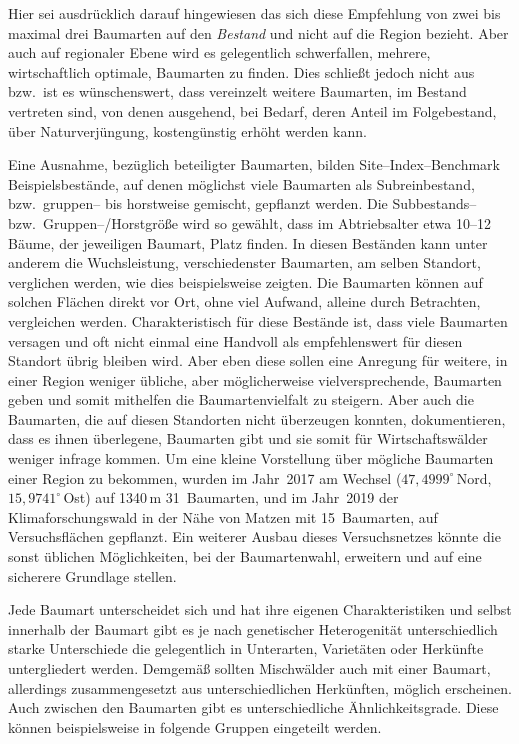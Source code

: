 \documentclass[twocolumn]{scrartcl}
\begin{document}
Hier sei ausdrücklich darauf hingewiesen das sich diese Empfehlung von zwei bis
maximal drei Baumarten auf den \emph{Bestand} und nicht auf die Region bezieht.
Aber auch auf regionaler Ebene wird es gelegentlich schwerfallen, mehrere,
wirtschaftlich optimale, Baumarten zu finden. Dies schließt jedoch nicht aus
bzw.\ ist es wünschenswert, dass vereinzelt weitere Baumarten, im Bestand
vertreten sind, von denen ausgehend, bei Bedarf, deren Anteil im Folgebestand,
über Naturverjüngung, kostengünstig erhöht werden kann.

Eine Ausnahme, bezüglich beteiligter Baumarten, bilden Site--Index--Benchmark
Beispielsbestände, auf denen möglichst viele Baumarten als Subreinbestand, bzw.\
gruppen-- bis horstweise gemischt, gepflanzt werden. Die Subbestands-- bzw.\
Gruppen--/Horstgröße wird so gewählt, dass im Abtriebsalter etwa 10--12 Bäume,
der jeweiligen Baumart, Platz finden. In diesen Beständen kann unter anderem die
Wuchsleistung, verschiedenster Baumarten, am selben Standort, verglichen werden,
wie dies beispielsweise \cite{mayer1970anbauversuch} zeigten. Die Baumarten
können auf solchen Flächen direkt vor Ort, ohne viel Aufwand, alleine durch
Betrachten, vergleichen werden. Charakteristisch für diese Bestände ist, dass
viele Baumarten versagen und oft nicht einmal eine Handvoll als empfehlenswert
für diesen Standort übrig bleiben wird. Aber eben diese sollen eine Anregung für
weitere, in einer Region weniger übliche, aber möglicherweise vielversprechende,
Baumarten geben und somit mithelfen die Baumartenvielfalt zu steigern. Aber auch
die Baumarten, die auf diesen Standorten nicht überzeugen konnten,
dokumentieren, dass es ihnen überlegene, Baumarten gibt und sie somit für
Wirtschaftswälder weniger infrage kommen. Um eine kleine Vorstellung über
mögliche Baumarten einer Region zu bekommen, wurden im Jahr~2017 am Wechsel
($47,4999^{\circ}$\,Nord, $15,9741^{\circ}$\,Ost) auf 1340\,m 31~Baumarten, und
im Jahr~2019 der Klimaforschungswald in der Nähe von Matzen mit 15~Baumarten,
auf Versuchsflächen gepflanzt. Ein weiterer Ausbau dieses Versuchsnetzes könnte
die sonst üblichen Möglichkeiten, bei der Baumartenwahl, erweitern und auf eine
sicherere Grundlage stellen.

Jede Baumart unterscheidet sich und hat ihre eigenen Charakteristiken und selbst innerhalb der Baumart gibt es je nach genetischer Heterogenität unterschiedlich starke Unterschiede die gelegentlich in Unterarten, Varietäten oder Herkünfte untergliedert werden. Demgemäß sollten Mischwälder auch mit einer Baumart, allerdings zusammengesetzt aus unterschiedlichen Herkünften, möglich erscheinen. Auch zwischen den Baumarten gibt es unterschiedliche Ähnlichkeitsgrade. Diese können beispielsweise in folgende Gruppen eingeteilt werden.
\end{document}
